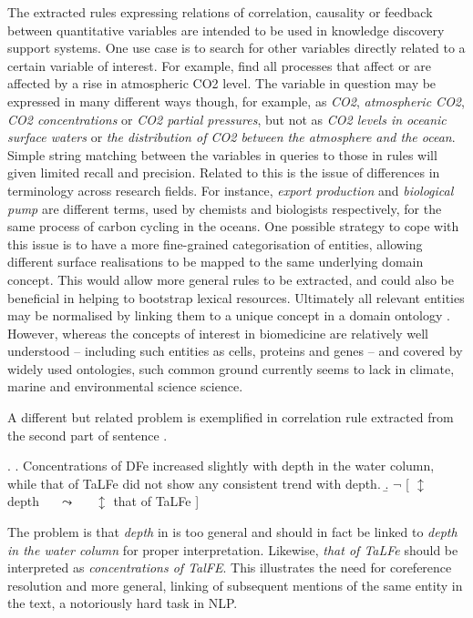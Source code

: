 \documentclass[10pt, a4paper]{article}
\begin{document}
The extracted rules expressing relations of correlation, causality or feedback between quantitative variables are intended to be used in knowledge discovery support systems.
One use case is to search for other variables directly related to a certain variable of interest.
For example, find all processes that affect or are affected by a rise in atmospheric CO2 level.
The variable in question may be expressed in many different ways though, for example, as \emph{CO2}, \emph{atmospheric CO2}, \emph{CO2 concentrations} or \emph{CO2 partial pressures}, but not as \emph{ CO2 levels in oceanic surface waters} or \emph{the distribution of CO2 between the atmosphere and the ocean}.
Simple string matching between the variables in queries to those in rules will given limited recall and precision.
Related to this is the issue of differences in terminology across research fields.
For instance, \emph{export production} and \emph{biological pump} are different terms, used by chemists and biologists respectively, for the same process of carbon cycling in the oceans. 
One possible strategy to cope with this issue is to have a more fine-grained categorisation of entities, allowing different surface realisations to be mapped to the same underlying domain concept. 
This would allow more general rules to be extracted, and could also be beneficial in helping to bootstrap lexical resources.
Ultimately all relevant entities may be normalised by linking them to a unique concept in a domain ontology \cite{Bada2012Concept}.
However, whereas the concepts of interest in biomedicine are relatively well understood -- including such entities as cells, proteins and genes -- and covered by widely used ontologies, such common ground currently seems to lack in climate, marine and environmental science science.

A different but related problem is exemplified in correlation rule \Next[b] extracted from the second part of sentence \Next[a].

\exi. 
  \a. Concentrations of DFe increased slightly with depth in the water column, while that of TaLFe did not show any consistent trend with depth.
  \b. $\neg$ [ $\updownarrow$ depth~~~$\leadsto$~~~$\updownarrow$ that of TaLFe ]

The problem is that \emph{depth} in \Last[b] is too general and should in fact be linked to \emph{depth in the water column} for proper interpretation. 
Likewise, \emph{that of TaLFe} should be interpreted as \emph{concentrations of TalFE}.
This illustrates the need for coreference resolution and more general, linking of subsequent mentions of the same entity in the text, a notoriously hard task in NLP. 
\end{document}

